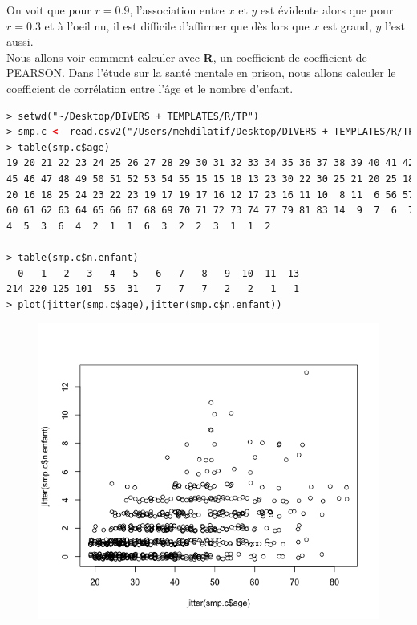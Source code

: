 On voit que pour $r=0.9$, l'association entre $x$ et $y$ est évidente alors que pour $r=0.3$ et à l'oeil nu, il est difficile d'affirmer que dès lors que 
$x$ est grand, $y$ l'est aussi.\newline
\\
Nous allons voir comment calculer avec \textbf{R}, un coefficient de coefficient de PEARSON. Dans l'étude sur la santé mentale en prison, nous allons calculer le coefficient de corrélation entre l'âge et le nombre d'enfant.
\begin{lstlisting}[language=html]
> setwd("~/Desktop/DIVERS + TEMPLATES/R/TP")
> smp.c <- read.csv2("/Users/mehdilatif/Desktop/DIVERS + TEMPLATES/R/TP/smp2.csv")
> table(smp.c$age)
19 20 21 22 23 24 25 26 27 28 29 30 31 32 33 34 35 36 37 38 39 40 41 42 43 44 
45 46 47 48 49 50 51 52 53 54 55 15 15 18 13 23 30 22 30 25 21 20 25 18 22 26 
20 16 18 25 24 23 22 23 19 17 19 17 16 12 17 23 16 11 10  8 11  6 56 57 58 59 
60 61 62 63 64 65 66 67 68 69 70 71 72 73 74 77 79 81 83 14  9  7  6  7  5  7  
4  5  3  6  4  2  1  1  6  3  2  2  3  1  1  2 

> table(smp.c$n.enfant)
  0   1   2   3   4   5   6   7   8   9  10  11  13 
214 220 125 101  55  31   7   7   7   2   2   1   1 
> plot(jitter(smp.c$age),jitter(smp.c$n.enfant))
\end{lstlisting}

\begin{figure}[H]\begin{center}\includegraphics[scale=0.5]{ilu/bx.png}\end{center}\end{figure}

